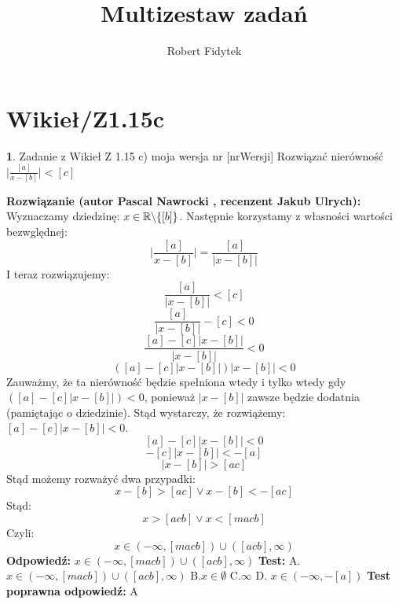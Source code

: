 \documentclass[12pt, a4paper]{article}
\title{Multizestaw zadań}
\author{Robert Fidytek}
\date{}
\theoremstyle{definition} %
\newtheorem{zad}{}
\newcommand{\kategoria}[1]{\section{#1}} %
\newcommand{\zadStart}[1]{\begin{zad}#1\newline} %
\newcommand{\zadStop}{\end{zad}}   %
\newcommand{\rozwStart}[2]{\noindent \textbf{Rozwiązanie (autor #1 , recenzent #2): }\newline} %
\newcommand{\odpStart}{\noindent \textbf{Odpowiedź:}\newline}    %
\newcommand{\odpStop}{\newline}                                             %
\newcommand{\testStart}{\noindent \textbf{Test:}\newline} %
\newcommand{\testStop}{\newline} %
\newcommand{\kluczStart}{\noindent \textbf{Test poprawna odpowiedź:}\newline} %
\newcommand{\kluczStop}{\newline} %
\begin{document}
\maketitle



\kategoria{Wikieł/Z1.15c}
\zadStart{Zadanie z Wikieł Z 1.15 c) moja wersja nr [nrWersji]}
Rozwiązać nierówność $\big|\frac{[a]}{x-[b]}\big|<[c]$
\zadStop
\rozwStart{Pascal Nawrocki}{Jakub Ulrych}
Wyznaczamy dziedzinę: $x\in\mathbb{R}\symbol{92}\{[b]\}$.
Następnie korzystamy z własności wartości bezwględnej:
$$\bigg|\frac{[a]}{x-[b]}\bigg|=\frac{[a]}{|x-[b]|}$$
I teraz rozwiązujemy:
$$\frac{[a]}{|x-[b]|}<[c]$$
$$\frac{[a]}{|x-[b]|}-[c]<0$$
$$\frac{[a]-[c]|x-[b]|}{|x-[b]|}<0$$
$$([a]-[c]|x-[b]|)|x-[b]|<0$$
Zauważmy, że ta nierówność będzie spełniona wtedy i tylko wtedy gdy \mbox{$([a]-[c]|x-[b]|)<0$}, ponieważ $|x-[b]|$ zawsze będzie dodatnia (pamiętając o dziedzinie). Stąd wystarczy, że rozwiążemy: $[a]-[c]|x-[b]|<0$.
$$[a]-[c]|x-[b]|<0$$
$$-[c]|x-[b]|<-[a]$$
$$|x-[b]|>[ac]$$
Stąd możemy rozważyć dwa przypadki:
$$x-[b]>[ac] \vee x-[b]<-[ac]$$
Stąd:
$$x>[acb] \vee x<[macb]$$
Czyli:
$$x\in(-\infty,[macb])\cup([acb],\infty)$$
\odpStart
$x\in(-\infty,[macb])\cup([acb],\infty)$
\odpStop
\testStart
A.$x\in(-\infty,[macb])\cup([acb],\infty)$
B.$x\in \emptyset$
C.$\infty$
D. $x\in (-\infty,-[a])$
\testStop
\kluczStart
A
\kluczStop
\end{document}
